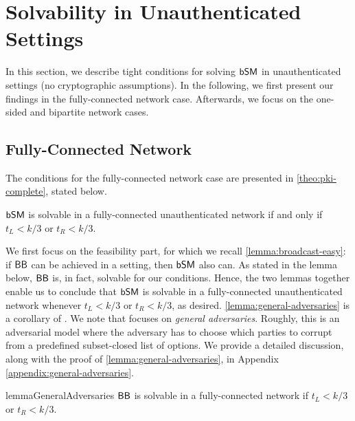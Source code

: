 \section{Solvability in Unauthenticated Settings} \label{section:no-pki}
In this section, we describe tight conditions for solving $\textsf{bSM}$ in unauthenticated settings (no cryptographic assumptions). In the following, we first present our findings in the fully-connected network case. Afterwards, we focus on the one-sided and bipartite network cases.

\subsection{Fully-Connected Network}

The conditions for the fully-connected network case are presented in \cref{theo:pki-complete}, stated below.
\begin{theorem} \label{theo:pki-complete}
$\textsf{bSM}$ is solvable in a fully-connected unauthenticated network if and only if $t_L < k/3$ or $t_R < k/3$.
\end{theorem}

We first focus on the feasibility part, for which we recall \cref{lemma:broadcast-easy}: if $\textsf{BB}$ can be achieved in a setting, then $\textsf{bSM}$ also can. As stated in the lemma below, $\textsf{BB}$ is, in fact, solvable for our conditions.
Hence, the two lemmas together enable us to conclude that $\textsf{bSM}$ is solvable in a fully-connected unauthenticated network whenever  $t_L < k / 3$ or $t_R < k / 3$, as desired. 
\cref{lemma:general-adversaries} is a corollary of \cite[{Theorem 2}]{DISC:FitMau98}. We note that \cite{DISC:FitMau98} focuses on \emph{general adversaries}.
Roughly, this is an adversarial model where the adversary has to choose which parties to corrupt from a predefined subset-closed list of options. We provide a detailed discussion, along with the proof of \cref{lemma:general-adversaries}, in Appendix \ref{appendix:general-adversaries}.


\begin{restatable}{lemma}{GeneralAdversaries} \label{lemma:general-adversaries}
    $\textsf{BB}$ is solvable in a fully-connected network if $t_L < k/3$ or $t_R < k/3$.
\end{restatable}


